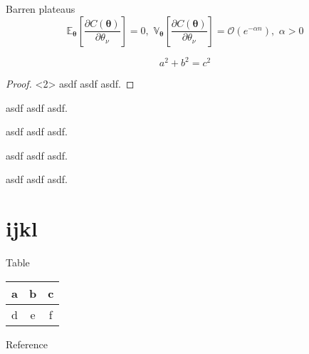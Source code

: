 \documentclass[dvipdfmx,10pt,aspectratio=169]{beamer}
\begin{document}
\begin{frame}
    \begin{definition}Barren plateaus\cite{mcclean2018barren}
        $$ \mathbb{E}_{\boldsymbol{\theta}}\left[\frac{\partial C(\boldsymbol{\theta})}{\partial \theta_\nu}\right] = 0, \,\,\mathbb{V}_{\boldsymbol{\theta}}\left[\frac{\partial C(\boldsymbol{\theta})}{\partial \theta_\nu}\right] = \mathcal{O}(e^{-\alpha n}), \,\,\alpha > 0 $$
    \end{definition}
\end{frame}




\begin{frame}
    \begin{theorem}
        $$ a^2 + b^2 = c^2 $$
    \end{theorem}

    \begin{proof}<2>
        asdf asdf asdf.
    \end{proof}

\end{frame}





\begin{frame}
    \begin{warning}
        asdf asdf asdf.
    \end{warning}

    \begin{example}
        asdf asdf asdf.
    \end{example}

    \begin{important}
        asdf asdf asdf.
    \end{important}

    \begin{remark}
        asdf asdf asdf.
    \end{remark}
\end{frame}





\section{ijkl}

\begin{frame}{Table}
    \begin{table}[]
        \begin{tabular}{|l|c|c|}
        \hline
        a & b & c \\ \hline
        d & e & f \\ \hline
        \end{tabular}
    \end{table}
\end{frame}




\begin{frame}{Reference}
    \scriptsize
    \beamertemplatetextbibitems
    
    
\end{frame}
\end{document}
